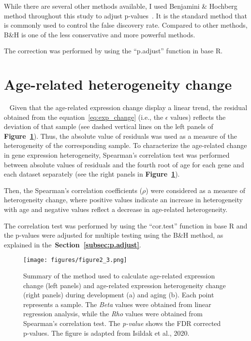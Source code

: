 While there are several other methods available, I used Benjamini {\&} Hochberg method throughout this study to adjust p-values~\cite{Benjamin1995}.
It is the standard method that is commonly used to control the false discovery rate. 
Compared to other methods, B{\&}H is one of the less conservative and more powerful methods.

The correction was performed by using the ``p.adjust'' function in base R.

\section{Age-related heterogeneity change}~\label{sec:het-change}
Given that the age-related expression change display a linear trend, the residual obtained from the equation~\ref{eq:exp_change} (i.e., the $\epsilon$ values)
reflects the deviation of that sample (see dashed vertical lines on the left panels of \textbf{Figure~\ref{fig:fig2.3}}).
Thus, the absolute value of residuals was used as a measure of the heterogeneity of the corresponding sample. 
To characterize the age-related change in gene expression heterogeneity,
Spearman's correlation test was performed between absolute values of residuals and 
the fourth root of age for each gene and each dataset separately (see the right panels in \textbf{Figure~\ref{fig:fig2.3}}).

Then, the Spearman's correlation coefficients ($\rho$) were considered as a measure of heterogeneity change, 
where positive values indicate an increase in heterogeneity with age and negative values reflect a decrease in age-related heterogeneity. 

The correlation test was performed by using the ``cor.test'' function in base R and the p-values were adjusted for multiple testing using the B{\&}H method, 
as explained in the~\textbf{Section~\ref{subsec:p.adjust}}.

\begin{figure}[h]
\centering
\texttt{[image: figures/figure2\_3.png]}
\caption{Summary of the method used to calculate age-related expression change (left panels) 
and age-related expression heterogeneity change (right panels) during development (a) and aging (b). 
Each point represents a sample.
The \textit{Beta} values were obtained from linear regression analysis, while the \textit{Rho} values were obtained from Spearman's correlation test. 
The \textit{p-value} shows the FDR corrected p-values. 
The figure is adapted from Isildak et al., 2020.}\label{fig:fig2.3}
\end{figure}

